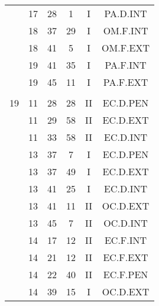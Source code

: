 \documentclass[12pt, a4paper]{article}
\begin{document}
\begin{multicols}{3}
{\begin{tabular}{c c c c c c}
	 	 	 	 & 17 & 28 & 1 & I & PA.D.INT\\%
	 	 	 	 & 18 & 37 & 29 & I & OM.F.INT\\%
	 	 	 	 & 18 & 41 & 5 & I & OM.F.EXT\\%
	 	 	 	 & 19 & 41 & 35 & I & PA.F.INT\\%
	 	 	 	 & 19 & 45 & 11 & I & PA.F.EXT\\%
	 	 	 	 & & & & & \\%
	 	 	 	19 & 11 & 28 & 28 & II & EC.D.PEN\\%
	 	 	 	 & 11 & 29 & 58 & II & EC.D.EXT\\%
	 	 	 	 & 11 & 33 & 58 & II & EC.D.INT\\%
	 	 	 	 & 13 & 37 & 7 & I & EC.D.PEN\\%
	 	 	 	 & 13 & 37 & 49 & I & EC.D.EXT\\%
	 	 	 	 & 13 & 41 & 25 & I & EC.D.INT\\%
	 	 	 	 & 13 & 41 & 11 & II & OC.D.EXT\\%
	 	 	 	 & 13 & 45 & 7 & II & OC.D.INT\\%
	 	 	 	 & 14 & 17 & 12 & II & EC.F.INT\\%
	 	 	 	 & 14 & 21 & 12 & II & EC.F.EXT\\%
	 	 	 	 & 14 & 22 & 40 & II & EC.F.PEN\\%
	 	 	 	 & 14 & 39 & 15 & I & OC.D.EXT\\%
	 	 \end{tabular}
 	}
\end{multicols}
\end{document}
